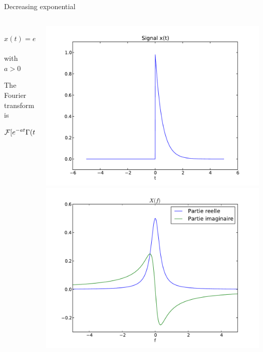       \begin{exampleblock}{Decreasing exponential}
        \vspace{-5mm}
          \begin{columns}
              \begin{column}%
        $$x(t) = e^{-at} \Gamma(t), \quad   \Gamma(t)=
        \begin{cases}
          1& \text{for } t>0\\
          1/2& \text{for } t=0\\
          0& \text{else}
        \end{cases}$$
        with $a>0$
        
        The Fourier transform is
        \begin{align*}
          \mathcal{F}[e^{-at} \Gamma(t)]=&  \int_{0}^\infty e^{-at} e^{- i 2 \pi f t}  dt\\
          =&  \int_{0}^\infty e^{-(a+ i 2 \pi f)t} dt\\
          =& \left[\frac{e^{-(a+ i 2 \pi f)t}}{-(a+ i 2 \pi f)}\right]_0^\infty\\
          =&\frac{1}{a+ i 2 \pi f}
        \end{align*}
               \end{column}
              \begin{column}%
                \begin{center}
                \includegraphics[width=.45\columnwidth]{imgs/fourier/sig_exp_ft.pdf}
                \includegraphics[width=.45\columnwidth]{imgs/fourier/ft_sig_exp_ft.pdf}
              \end{center}
             \end{column}
            \end{columns}
        
          \end{exampleblock}


